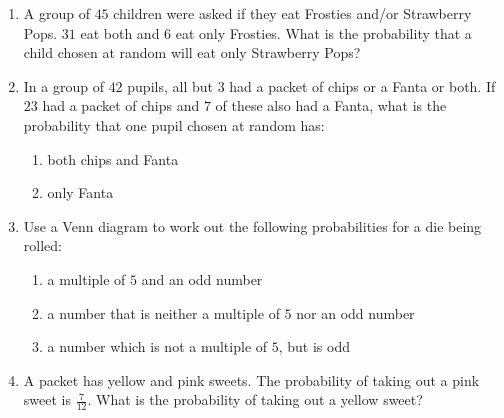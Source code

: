 \begin{eocexercises}{}
  \begin{enumerate}[itemsep=5pt, label=\textbf{\arabic*}. ]
  \item A group of $45$ children were asked if they eat Frosties and/or
    Strawberry Pops. $31$ eat both and $6$ eat only Frosties. What is the
    probability that a child chosen at random will eat only Strawberry
    Pops?
  \item In a group of $42$ pupils, all but $3$ had a packet of chips
    or a Fanta or both. If $23$ had a packet of chips and $7$ of these
    also had a Fanta, what is the probability that one pupil chosen at
    random has:
    \begin{enumerate}[noitemsep, label=\textbf{(\alph*)} ]
    \item both chips and Fanta
    \item only Fanta
    \end{enumerate}
  \item Use a Venn diagram to work out the following probabilities
    for a die being rolled:
    \begin{enumerate}[noitemsep, label=\textbf{(\alph*)} ]
    \item a multiple of $5$ and an odd number
    \item a number that is neither a multiple of $5$ nor an odd
      number
    \item a number which is not a multiple of $5$, but is odd
    \end{enumerate}
  \item A packet has yellow and pink sweets. The probability of taking
    out a pink sweet is $\frac{7}{12}$. What is the probability of taking out a yellow sweet?


\end{enumerate}
\end{eocexercises}
